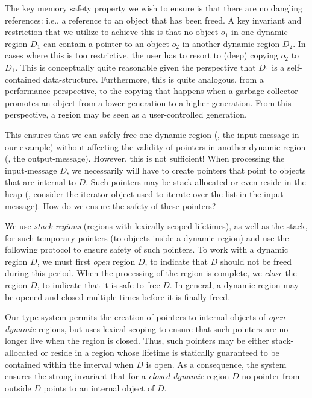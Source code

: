 The key memory safety property we wish to ensure is that there are no
dangling references: i.e., a reference to an object that has been
freed.  A key invariant and restriction that we utilize to achieve
this is that no object $o_1$ in one dynamic region $D_1$ can contain a
pointer to an object $o_2$ in another dynamic region $D_2$.  In cases
where this is too restrictive, the user has to resort to (deep)
copying $o_2$ to $D_1$.  This is conceptually quite reasonable given
the perspective that $D_1$ is a self-contained data-structure.
Furthermore, this is quite analogous, from a performance perspective,
to the copying that happens when a garbage collector promotes an
object from a lower generation to a higher generation.  From this
perspective, a region may be seen as a user-controlled generation.

This ensures that we can safely free one dynamic region (\eg, the
input-message in our example) without affecting the validity of
pointers in another dynamic region (\eg, the output-message).
However, this is not sufficient! When processing the input-message
$D$, we necessarily will have to create pointers that point to objects
that are internal to $D$. Such pointers may be stack-allocated or even
reside in the heap (\eg, consider the iterator object used to iterate
over the list in the input-message).  How do we ensure the safety of
these pointers?

We use \emph{stack regions} (regions with lexically-scoped lifetimes),
as well as the stack, for such temporary pointers (to objects inside a
dynamic region) and use the following protocol to ensure safety of
such pointers.  To work with a dynamic region $D$, we must first
\emph{open} region $D$, to indicate that $D$ should not be freed
during this period.  When the processing of the region is complete, we
\emph{close} the region $D$, to indicate that it is safe to free $D$.
In general, a dynamic region may be opened and closed multiple times
before it is finally freed.

Our type-system permits the creation of pointers to internal objects
of \emph{open dynamic} regions, but uses lexical scoping to ensure
that such pointers are no longer live when the region is closed.
Thus, such pointers may be either stack-allocated or reside in a
region whose lifetime is statically guaranteed to be contained within
the interval when $D$ is open.  As a consequence, the system ensures
the strong invariant that for a \emph{closed dynamic} region $D$ no
pointer from outside $D$ points to an internal object of $D$.

